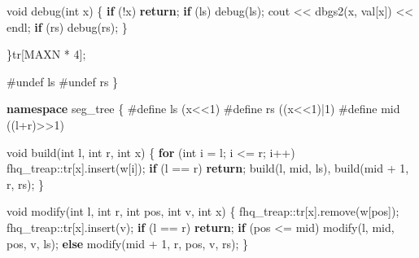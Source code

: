 \documentclass[
]{article}
\newenvironment{Shaded}{}{}
\newcommand{\ControlFlowTok}[1]{\textcolor[rgb]{0.00,0.44,0.13}{\textbf{#1}}}
\newcommand{\DataTypeTok}[1]{\textcolor[rgb]{0.56,0.13,0.00}{#1}}
\newcommand{\DecValTok}[1]{\textcolor[rgb]{0.25,0.63,0.44}{#1}}
\newcommand{\FunctionTok}[1]{\textcolor[rgb]{0.02,0.16,0.49}{#1}}
\newcommand{\KeywordTok}[1]{\textcolor[rgb]{0.00,0.44,0.13}{\textbf{#1}}}
\newcommand{\NormalTok}[1]{#1}
\newcommand{\PreprocessorTok}[1]{\textcolor[rgb]{0.74,0.48,0.00}{#1}}
\begin{document}
\begin{Shaded}
\begin{Highlighting}[]
        \DataTypeTok{void}\NormalTok{ debug(}\DataTypeTok{int}\NormalTok{ x)}
\NormalTok{        \{}
            \ControlFlowTok{if}\NormalTok{ (!x) }\ControlFlowTok{return}\NormalTok{;}
            \ControlFlowTok{if}\NormalTok{ (ls) debug(ls);}
\NormalTok{            cout \textless{}\textless{} dbgs2(x, val[x]) \textless{}\textless{} endl;}
            \ControlFlowTok{if}\NormalTok{ (rs) debug(rs);}
\NormalTok{        \}}

\NormalTok{    \}}\FunctionTok{tr}\NormalTok{[MAXN * }\DecValTok{4}\NormalTok{];}

\PreprocessorTok{\#undef ls}
\PreprocessorTok{\#undef rs}
\NormalTok{\}}

\KeywordTok{namespace}\NormalTok{ seg\_tree}
\NormalTok{\{}
\PreprocessorTok{\#define ls }\NormalTok{(x\textless{}\textless{}}\DecValTok{1}\NormalTok{)}
\PreprocessorTok{\#define rs }\NormalTok{((x\textless{}\textless{}}\DecValTok{1}\NormalTok{)|}\DecValTok{1}\NormalTok{)}
\PreprocessorTok{\#define mid }\NormalTok{((l+r)\textgreater{}\textgreater{}}\DecValTok{1}\NormalTok{)}

    \DataTypeTok{void}\NormalTok{ build(}\DataTypeTok{int}\NormalTok{ l, }\DataTypeTok{int}\NormalTok{ r, }\DataTypeTok{int}\NormalTok{ x)}
\NormalTok{    \{}
        \ControlFlowTok{for}\NormalTok{ (}\DataTypeTok{int}\NormalTok{ i = l; i \textless{}= r; i++)}
\NormalTok{            fhq\_treap::}\FunctionTok{tr}\NormalTok{[x].insert(w[i]);}
        \ControlFlowTok{if}\NormalTok{ (l == r) }\ControlFlowTok{return}\NormalTok{;}
\NormalTok{        build(l, mid, ls), build(mid + }\DecValTok{1}\NormalTok{, r, rs);}
\NormalTok{    \}}

    \DataTypeTok{void}\NormalTok{ modify(}\DataTypeTok{int}\NormalTok{ l, }\DataTypeTok{int}\NormalTok{ r, }\DataTypeTok{int}\NormalTok{ pos, }\DataTypeTok{int}\NormalTok{ v, }\DataTypeTok{int}\NormalTok{ x)}
\NormalTok{    \{}
\NormalTok{        fhq\_treap::}\FunctionTok{tr}\NormalTok{[x].remove(w[pos]);}
\NormalTok{        fhq\_treap::}\FunctionTok{tr}\NormalTok{[x].insert(v);}
        \ControlFlowTok{if}\NormalTok{ (l == r) }\ControlFlowTok{return}\NormalTok{;}
        \ControlFlowTok{if}\NormalTok{ (pos \textless{}= mid) modify(l, mid, pos, v, ls);}
        \ControlFlowTok{else}\NormalTok{ modify(mid + }\DecValTok{1}\NormalTok{, r, pos, v, rs);}
\NormalTok{    \}}


\end{Highlighting}
\end{Shaded}
\end{document}
